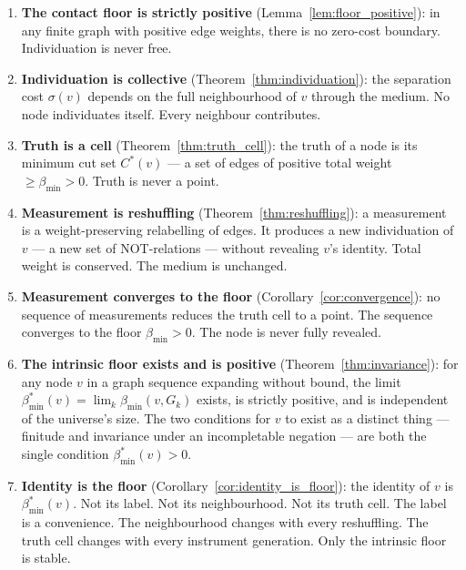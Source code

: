 \documentclass[11pt,twocolumn,a4paper]{article}
\theoremstyle{plain}
\theoremstyle{definition}
\theoremstyle{remark}
\newcommand{\bmin}{\beta_{\min}}
\begin{document}
\begin{enumerate}
\item \textbf{The contact floor is strictly positive}
  (Lemma~\ref{lem:floor_positive}): in any finite graph with positive edge
  weights, there is no zero-cost boundary. Individuation is never free.

\item \textbf{Individuation is collective} (Theorem~\ref{thm:individuation}):
  the separation cost $\sigma(v)$ depends on the full neighbourhood of $v$
  through the medium. No node individuates itself. Every neighbour
  contributes.

\item \textbf{Truth is a cell} (Theorem~\ref{thm:truth_cell}): the truth of
  a node is its minimum cut set $C^*(v)$ --- a set of edges of positive
  total weight $\geq \bmin > 0$. Truth is never a point.

\item \textbf{Measurement is reshuffling} (Theorem~\ref{thm:reshuffling}):
  a measurement is a weight-preserving relabelling of edges. It produces
  a new individuation of $v$ --- a new set of NOT-relations --- without
  revealing $v$'s identity. Total weight is conserved. The medium is
  unchanged.

\item \textbf{Measurement converges to the floor}
  (Corollary~\ref{cor:convergence}): no sequence of measurements reduces
  the truth cell to a point. The sequence converges to the floor $\bmin > 0$.
  The node is never fully revealed.

\item \textbf{The intrinsic floor exists and is positive}
  (Theorem~\ref{thm:invariance}): for any node $v$ in a graph sequence
  expanding without bound, the limit $\bmin^*(v) = \lim_k \bmin(v, G_k)$
  exists, is strictly positive, and is independent of the universe's size.
  The two conditions for $v$ to exist as a distinct thing --- finitude and
  invariance under an incompletable negation --- are both the single
  condition $\bmin^*(v) > 0$.

\item \textbf{Identity is the floor} (Corollary~\ref{cor:identity_is_floor}):
  the identity of $v$ is $\bmin^*(v)$. Not its label. Not its neighbourhood.
  Not its truth cell. The label is a convenience. The neighbourhood changes
  with every reshuffling. The truth cell changes with every instrument
  generation. Only the intrinsic floor is stable.


\end{enumerate}
\end{document}

